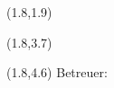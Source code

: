 \begin{textblock}{11}(1.8,1.9)
	\sffamily%
	\huge%
	\Centering%
	\textbf{\WorktitleDivided}
\end{textblock}
\begin{textblock}{11}(1.8,3.7)
	\Centering%
	\sffamily%
	\Large
	\textbf{\Authorname}
	\newline
\end{textblock}
\begin{textblock}{11}(1.8,4.6)
	\Centering
	\sffamily%
	\large
	Betreuer: \Reviewer
\end{textblock}